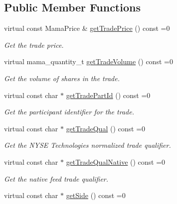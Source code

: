 \subsection*{Public Member Functions}
\begin{CompactItemize}
\item 
virtual const Mama\-Price \& \hyperlink{classWombat_1_1MamdaTradeReport_97a38026a45edb298ffe62530d43cde4}{get\-Trade\-Price} () const =0
\begin{CompactList}\small\item\em Get the trade price. \item\end{CompactList}\item 
virtual mama\_\-quantity\_\-t \hyperlink{classWombat_1_1MamdaTradeReport_167dd8f71093494ce5d0ff7a85739cbf}{get\-Trade\-Volume} () const =0
\begin{CompactList}\small\item\em Get the volume of shares in the trade. \item\end{CompactList}\item 
virtual const char $\ast$ \hyperlink{classWombat_1_1MamdaTradeReport_eb865e0b7c57732356d925d532364c7b}{get\-Trade\-Part\-Id} () const =0
\begin{CompactList}\small\item\em Get the participant identifier for the trade. \item\end{CompactList}\item 
virtual const char $\ast$ \hyperlink{classWombat_1_1MamdaTradeReport_01f6e34bc27e4c6a9d2262327c2961d7}{get\-Trade\-Qual} () const =0
\begin{CompactList}\small\item\em Get the NYSE Technologies normalized trade qualifier. \item\end{CompactList}\item 
virtual const char $\ast$ \hyperlink{classWombat_1_1MamdaTradeReport_e904b58ff3ad3cb36442c4f1db2a7523}{get\-Trade\-Qual\-Native} () const =0
\begin{CompactList}\small\item\em Get the native feed trade qualifier. \item\end{CompactList}\item 
virtual const char $\ast$ \hyperlink{classWombat_1_1MamdaTradeReport_ceb8234499a7ebd85378094dbed4705a}{get\-Side} () const =0

\end{CompactItemize}
